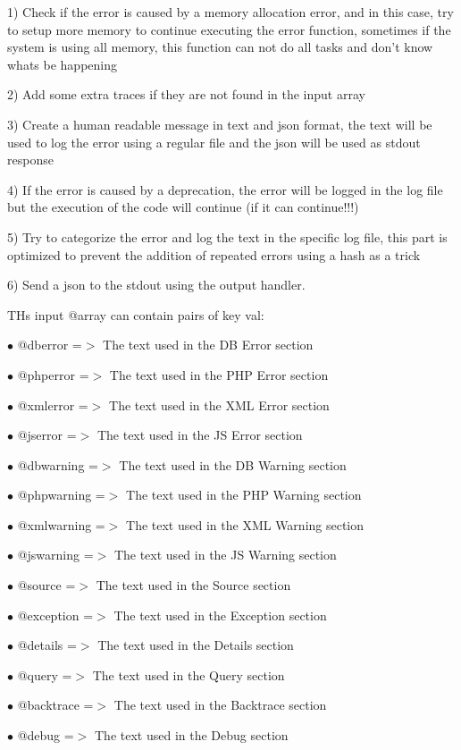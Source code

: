 \documentclass[a4paper]{book}
\begin{document}
1) Check if the error is caused by a memory allocation error, and in this case, try
to setup more memory to continue executing the error function, sometimes if the system
is using all memory, this function can not do all tasks and don't know whats be happening

2) Add some extra traces if they are not found in the input array

3) Create a human readable message in text and json format, the text will be used
to log the error using a regular file and the json will be used as stdout response

4) If the error is caused by a deprecation, the error will be logged in the log file
but the execution of the code will continue (if it can continue!!!)

5) Try to categorize the error and log the text in the specific log file, this part
is optimized to prevent the addition of repeated errors using a hash as a trick

6) Send a json to the stdout using the output handler.

THs input @array can contain pairs of key val:

\begin{compactitem}
\item[\color{myblue}$\bullet$] @dberror    =$>$ The text used in the DB Error section
\item[\color{myblue}$\bullet$] @phperror   =$>$ The text used in the PHP Error section
\item[\color{myblue}$\bullet$] @xmlerror   =$>$ The text used in the XML Error section
\item[\color{myblue}$\bullet$] @jserror    =$>$ The text used in the JS Error section
\item[\color{myblue}$\bullet$] @dbwarning  =$>$ The text used in the DB Warning section
\item[\color{myblue}$\bullet$] @phpwarning =$>$ The text used in the PHP Warning section
\item[\color{myblue}$\bullet$] @xmlwarning =$>$ The text used in the XML Warning section
\item[\color{myblue}$\bullet$] @jswarning  =$>$ The text used in the JS Warning section
\item[\color{myblue}$\bullet$] @source     =$>$ The text used in the Source section
\item[\color{myblue}$\bullet$] @exception  =$>$ The text used in the Exception section
\item[\color{myblue}$\bullet$] @details    =$>$ The text used in the Details section
\item[\color{myblue}$\bullet$] @query      =$>$ The text used in the Query section
\item[\color{myblue}$\bullet$] @backtrace  =$>$ The text used in the Backtrace section
\item[\color{myblue}$\bullet$] @debug      =$>$ The text used in the Debug section
\end{compactitem}
\end{document}

